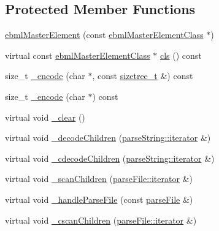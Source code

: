 \subsection*{Protected Member Functions}
\begin{DoxyCompactItemize}
\item 
\mbox{\hyperlink{classebml_1_1ebmlMasterElement_a874430a761ddf6eeb704d40136e75d33}{ebml\+Master\+Element}} (const \mbox{\hyperlink{classebml_1_1ebmlMasterElementClass}{ebml\+Master\+Element\+Class}} $\ast$)
\item 
virtual const \mbox{\hyperlink{classebml_1_1ebmlMasterElementClass}{ebml\+Master\+Element\+Class}} $\ast$ \mbox{\hyperlink{classebml_1_1ebmlMasterElement_a4073fb3f7ce3dda153384821714df29e}{cls}} () const
\item 
size\+\_\+t \mbox{\hyperlink{classebml_1_1ebmlMasterElement_ab50b9cdd8e402150cd96a19d613c98f5}{\+\_\+encode}} (char $\ast$, const \mbox{\hyperlink{structebml_1_1sizetree__t}{sizetree\+\_\+t}} \&) const
\item 
size\+\_\+t \mbox{\hyperlink{classebml_1_1ebmlMasterElement_aa0dd7215a5de90f8a52364df781952e2}{\+\_\+encode}} (char $\ast$) const
\item 
virtual void \mbox{\hyperlink{classebml_1_1ebmlMasterElement_a2fdf9fa1022f06a046fe94e631e266a3}{\+\_\+clear}} ()
\item 
virtual void \mbox{\hyperlink{classebml_1_1ebmlMasterElement_ae486adb2522e8d10177c70d889c32922}{\+\_\+decode\+Children}} (\mbox{\hyperlink{classebml_1_1parseString_1_1iterator}{parse\+String\+::iterator}} \&)
\item 
virtual void \mbox{\hyperlink{classebml_1_1ebmlMasterElement_af4b802cb2b71b57215d6e0f25f9fa25e}{\+\_\+cdecode\+Children}} (\mbox{\hyperlink{classebml_1_1parseString_1_1iterator}{parse\+String\+::iterator}} \&)
\item 
virtual void \mbox{\hyperlink{classebml_1_1ebmlMasterElement_a233be2f503f44d36608b16db5a2c3394}{\+\_\+scan\+Children}} (\mbox{\hyperlink{classebml_1_1parseFile_1_1iterator}{parse\+File\+::iterator}} \&)
\item 
virtual void \mbox{\hyperlink{classebml_1_1ebmlMasterElement_ab0cf3b000a54169e233f38aef9dcb4e1}{\+\_\+handle\+Parse\+File}} (const \mbox{\hyperlink{classebml_1_1parseFile}{parse\+File}} \&)
\item 
virtual void \mbox{\hyperlink{classebml_1_1ebmlMasterElement_a5c076b30207aefe6f6ecc46de3b96379}{\+\_\+cscan\+Children}} (\mbox{\hyperlink{classebml_1_1parseFile_1_1iterator}{parse\+File\+::iterator}} \&)

\end{DoxyCompactItemize}
